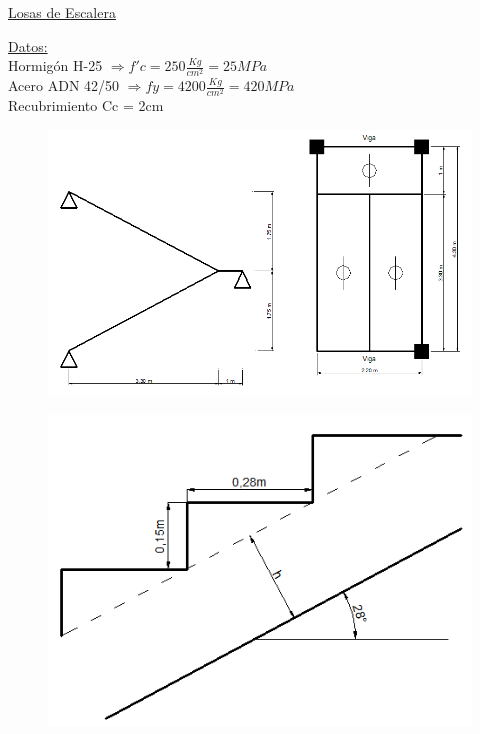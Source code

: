 \begin{center}
\underline{\Large{Losas de Escalera}}
\end{center}

\underline{Datos:}\\
Hormigón H-25 $\Rightarrow f'c = 250 \frac{Kg}{cm^2} = 25 MPa$\\
Acero ADN 42/50 $\Rightarrow fy = 4200 \frac{Kg}{cm^2} = 420 MPa$\\
Recubrimiento Cc = 2cm\\

\begin{figure}[H]
\begin{center}
     \includegraphics[scale = 0.85]{chapters/chapter_2/images/escalera1.png}
\end{center}
\end{figure}
\begin{figure}[H]
\begin{center}
     \includegraphics[scale = 0.8]{chapters/chapter_2/images/escalera2.png}
\end{center}
\end{figure}
